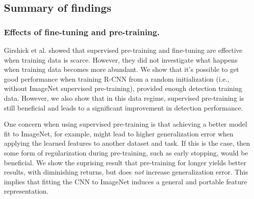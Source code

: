 
\subsection{Summary of findings}

\subsubsection{Effects of fine-tuning and pre-training.} 
Girshick et al. \cite{Rcnn} showed that supervised pre-training and fine-tuning are effective when training data is scarce.
However, they did not investigate what happens when training data becomes more abundant.
We show that it's possible to get good performance when training R-CNN from a random initialization (i.e., without ImageNet supervised pre-training), provided enough detection training data.
However, we also show that in this data regime, supervised pre-training is still beneficial and leads to a significant improvement in detection performance.

One concern when using supervised pre-training is that achieving a better model fit to ImageNet, for example, might lead to higher generalization error when applying the learned features to another dataset and task.
If this is the case, then some form of regularization during pre-training, such as early stopping, would be beneficial.
We show the suprising result that pre-training for longer yields better results, with diminishing returns, but does \emph{not} increase generalization error.
This implies that fitting the CNN to ImageNet induces a general and portable feature representation.



